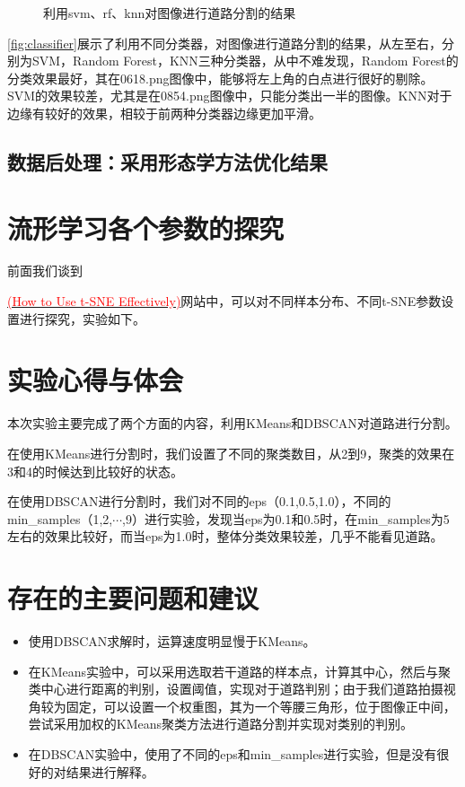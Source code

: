 \documentclass[12pt,hyperref,a4paper,UTF8]{ctexart}
\begin{document}
{\begin{figure}[!h]
	\caption{利用svm、rf、knn对图像进行道路分割的结果}
	\label{fig:classifier}
\end{figure}


\par
\autoref{fig:classifier}展示了利用不同分类器，对图像进行道路分割的结果，从左至右，分别为SVM，Random Forest，KNN三种分类器，从中不难发现，Random Forest的分类效果最好，其在0618.png图像中，能够将左上角的白点进行很好的剔除。SVM的效果较差，尤其是在0854.png图像中，只能分类出一半的图像。KNN对于边缘有较好的效果，相较于前两种分类器边缘更加平滑。


\subsection{数据后处理：采用形态学方法优化结果}



\section{流形学习各个参数的探究}
前面我们谈到{\href{https://distill.pub/2016/misread-tsne}{\textcolor{red}{(How to Use t-SNE Effectively)}}网站中，可以对不同样本分布、不同t-SNE参数设置进行探究，实验如下。
	

\section{实验心得与体会}
本次实验主要完成了两个方面的内容，利用KMeans和DBSCAN对道路进行分割。

在使用KMeans进行分割时，我们设置了不同的聚类数目，从2到9，聚类的效果在3和4的时候达到比较好的状态。

在使用DBSCAN进行分割时，我们对不同的eps（0.1,0.5,1.0），不同的min\_samples（1,2,$\cdots$,9）进行实验，发现当eps为0.1和0.5时，在min\_samples为5左右的效果比较好，而当eps为1.0时，整体分类效果较差，几乎不能看见道路。


\section{存在的主要问题和建议}

\begin{itemize}
    \item 使用DBSCAN求解时，运算速度明显慢于KMeans。
    \item 在KMeans实验中，可以采用选取若干道路的样本点，计算其中心，然后与聚类中心进行距离的判别，设置阈值，实现对于道路判别；由于我们道路拍摄视角较为固定，可以设置一个权重图，其为一个等腰三角形，位于图像正中间，尝试采用加权的KMeans聚类方法进行道路分割并实现对类别的判别。
    \item 在DBSCAN实验中，使用了不同的eps和min\_samples进行实验，但是没有很好的对结果进行解释。
\end{itemize}


}}
\end{document}
